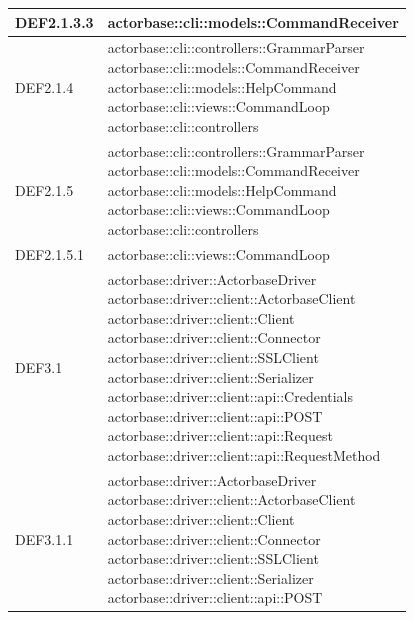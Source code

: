 \documentclass{scalatekids-article}
\begin{document}
\begin{longtable}[H]{|p{5cm}|p{12cm}|}
\hline
DEF2.1.3.3 & \multiLineCell[t]{actorbase::cli::models::CommandReceiver\\}\\
\hline
DEF2.1.4 & \multiLineCell[t]{actorbase::cli::controllers::GrammarParser\\actorbase::cli::models::CommandReceiver\\actorbase::cli::models::HelpCommand\\actorbase::cli::views::CommandLoop\\actorbase::cli::controllers\\}\\
\hline
DEF2.1.5 & \multiLineCell[t]{actorbase::cli::controllers::GrammarParser\\actorbase::cli::models::CommandReceiver\\actorbase::cli::models::HelpCommand\\actorbase::cli::views::CommandLoop\\actorbase::cli::controllers\\}\\
\hline
DEF2.1.5.1 & \multiLineCell[t]{actorbase::cli::views::CommandLoop\\}\\
\hline
DEF3.1 & \multiLineCell[t]{actorbase::driver::ActorbaseDriver\\actorbase::driver::client::ActorbaseClient\\actorbase::driver::client::Client\\actorbase::driver::client::Connector\\actorbase::driver::client::SSLClient\\actorbase::driver::client::Serializer\\actorbase::driver::client::api::Credentials\\actorbase::driver::client::api::POST\\actorbase::driver::client::api::Request\\actorbase::driver::client::api::RequestMethod\\}\\
\hline
DEF3.1.1 & \multiLineCell[t]{actorbase::driver::ActorbaseDriver\\actorbase::driver::client::ActorbaseClient\\actorbase::driver::client::Client\\actorbase::driver::client::Connector\\actorbase::driver::client::SSLClient\\actorbase::driver::client::Serializer\\actorbase::driver::client::api::POST\\}\\

\end{longtable}
\end{document}
